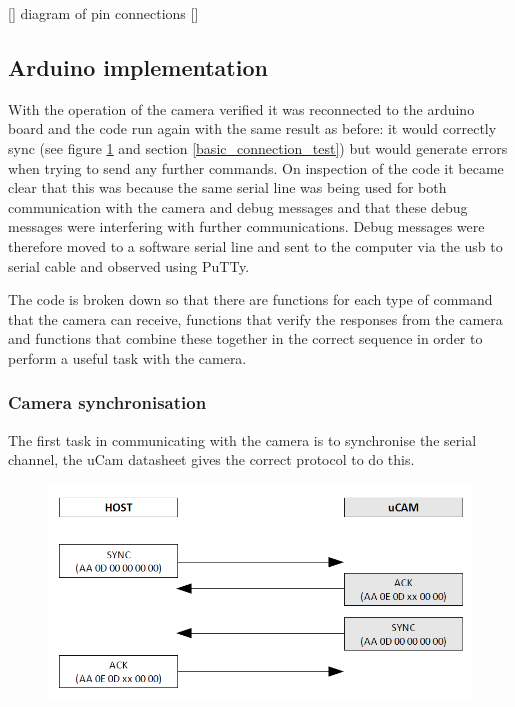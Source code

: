 [] diagram of pin connections []

\subsection{Arduino implementation}

With the operation of the camera verified it was reconnected to the arduino board and the code run again with the same result as before: it would correctly sync (see figure \ref{fig:syncProto} and section \ref{basic_connection_test}) but would generate errors when trying to send any further commands. On inspection of the code it became clear that this was because the same serial line was being used for both communication with the camera and debug messages and that these debug messages were interfering with further communications. Debug messages were therefore moved to a software serial line and sent to the computer via the usb to serial cable and observed using PuTTy.

The code is broken down so that there are functions for each type of command that the camera can receive, functions that verify the responses from the camera and functions that combine these together in the correct sequence in order to perform a useful task with the camera.

\subsubsection{Camera synchronisation}

The first task in communicating with the camera is to synchronise the serial channel, the uCam datasheet \cite{ucam_datasheet} gives the correct protocol to do this.

\begin{figure}[H]
        \centering
        \includegraphics[width=1.00\textwidth]{figures/SyncProtocal.png}
        \label{fig:syncProto}
\end{figure}

